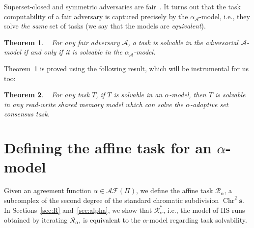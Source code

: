 \documentclass[a4paper]{article}
\newtheorem{theorem}{Theorem}
\newcommand{\remove}[1]{}
\def\A{\ensuremath{\mathcal{A}}}
\def\R{\ensuremath{\mathcal{R}}}
\def\fair{\textit{fair}}
\def\s {\mathbf{s}}
\def\Chr{\operatorname{Chr}}
\begin{document}
Superset-closed and symmetric adversaries are fair~\cite{KR17}.
%
It turns out that the task computability of a fair adversary is
captured precisely by the $\alpha_\A$-model, i.e.,
they solve \emph{the same} set of tasks
(we say that the models are \emph{equivalent}).

\begin{theorem}~\cite{KR17}
\label{th:adv:task}
For any {\fair} adversary $\A$, a task is solvable in the adversarial
$\A$-model if and only if it is solvable in the $\alpha_\A$-model. %
\end{theorem} 
%
%
Theorem~\ref{th:adv:task} is proved using the following result, which
will be instrumental for us too:
\begin{theorem}~\cite{KR17}
\label{read/writeAndConsensus}
For any task $T$, if $T$ is solvable in an $\alpha$-model, then $T$ is solvable in \emph{any} read-write shared 
memory model which can solve the $\alpha$-adaptive set consensus task.
\end{theorem}

\remove{
%
\begin{theorem}~\cite{KR17}
  \label{thm:AdaptiveAgreement}
There exists an \emph{$\alpha$-adaptive}  set consensus algorithm
that, in any run with a participating set $P$,
satisfies the following properties: (\emph{Termination}) All \emph{correct} processes
eventually decide;
%
(\emph{Agreement}) At most $\alpha(P)$ different values are decided,
with $P$ the participation at the earliest time a process decided;
%
(\emph{Validity}) Each decided value has been proposed by some process.
\end{theorem}
}

\section{Defining the affine task for an $\alpha$-model}
\label{sec:def}

Given an agreement function $\alpha\in\mathcal{AF}(\Pi)$, 
we define the affine task $\R_\alpha$, a subcomplex of  
the second degree of the standard chromatic subdivision $\Chr^2\s$. 
In Sections~\ref{sec:R} and~\ref{sec:alpha}, we show that $\R_\alpha^*$, 
i.e., the model of IIS runs obtained by iterating $\R_\alpha$, is equivalent to 
the $\alpha$-model regarding task solvability.
\end{document}
